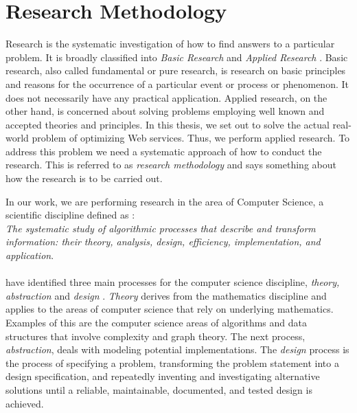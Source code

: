 \section{Research Methodology}

Research is the systematic investigation of how to find answers to a particular
problem. It is broadly classified into \textit{Basic Research} and
\textit{Applied Research} \cite{rajasekar2006research}. Basic research, also
called fundamental or pure research, is research on basic principles and reasons
for the occurrence of a particular event or process or phenomenon. It does not
necessarily have any practical application. Applied research, on the other hand,
is concerned about solving problems employing well known and accepted theories
and principles. In this thesis, we set out to solve the actual real-world
problem of optimizing Web services. Thus, we perform applied research. To
address this problem we need a systematic approach of how to conduct the
research. This is referred to as \textit{research methodology} and says
something about how the research is to be carried out.

In our work, we are performing research in the area of Computer Science, a
scientific discipline defined as \cite{denning}: \\

\textit{The systematic study of algorithmic processes that
describe and transform information: their theory, analysis, design, efficiency,
implementation, and application}.

\paragraph{}

 \citeauthor{denning} have identified three main processes for the computer
 science discipline, \textit{theory, abstraction} and \textit{design}
 \cite{denning}. \textit{Theory} derives from the mathematics discipline and
 applies to the areas of computer science that rely on underlying mathematics.
 Examples of this are the computer science areas of algorithms and data
 structures that involve complexity and graph theory. The next process,
 \textit{abstraction}, deals with modeling potential implementations. The
 \textit{design} process is the process of specifying a problem, transforming
 the problem statement into a design specification, and repeatedly inventing and
 investigating alternative solutions until a reliable, maintainable, documented,
 and tested design is achieved.

